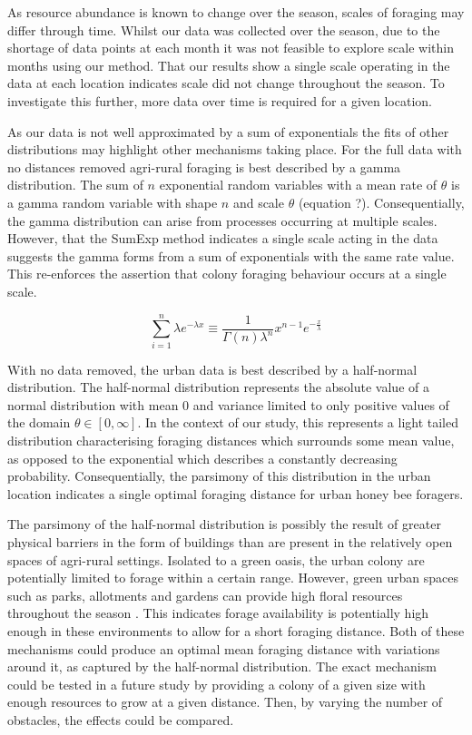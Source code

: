 \documentclass[11pt,usenames,dvipsnames]{article}
\begin{document}
As resource abundance is known to change over the season, scales of foraging may differ through time. Whilst our data was collected over the season, due to the shortage of data points at each month it was not feasible to explore scale within months using our method. That our results show a single scale operating in the data at each location indicates scale did not change throughout the season. To investigate this further, more data over time is required for a given location.

As our data is not well approximated by a sum of exponentials the fits of other distributions may highlight other mechanisms taking place. For the full data with no distances removed agri-rural foraging is best described by a gamma distribution. The sum of $n$ exponential random variables with a mean rate of $\theta$ is a gamma random variable with shape $n$ and scale $\theta$ (equation ?). Consequentially, the gamma distribution can arise from processes occurring at multiple scales. However, that the SumExp method indicates a single scale acting in the data suggests the gamma forms from a sum of exponentials with the same rate value. This re-enforces the assertion that colony foraging behaviour occurs at a single scale.

\begin{equation}
\sum_{i=1}^{n} \lambda e^{-\lambda x} \equiv \frac{1}{\Gamma(n)\lambda^n}x^{n-1}e^{-\frac{x}{\lambda}}
\end{equation}

With no data removed, the urban data is best described by a half-normal distribution. The half-normal distribution represents the absolute value of a normal distribution with mean 0 and variance limited to only positive values of the domain $\theta \in [0,\infty] $. In the context of our study, this represents a light tailed distribution characterising foraging distances which surrounds some mean value, as opposed to the exponential which describes a constantly decreasing probability. Consequentially, the parsimony of this distribution in the urban location indicates a single optimal foraging distance for urban honey bee foragers. 

The parsimony of the half-normal distribution is possibly the result of greater physical barriers in the form of buildings than are present in the relatively open spaces of agri-rural settings. Isolated to a green oasis, the urban colony are potentially limited to forage within a certain range. However, green urban spaces such as parks, allotments and gardens can provide high floral resources throughout the season \citep{Baldock2015, Baldock2019, Plascencia2017}. This indicates forage availability is potentially high enough in these environments to allow for a short foraging distance. Both of these mechanisms could produce an optimal mean foraging distance with variations around it, as captured by the half-normal distribution. The exact mechanism could be tested in a future study by providing a colony of a given size with enough resources to grow at a given distance. Then, by varying the number of obstacles, the effects could be compared. 
\end{document}
